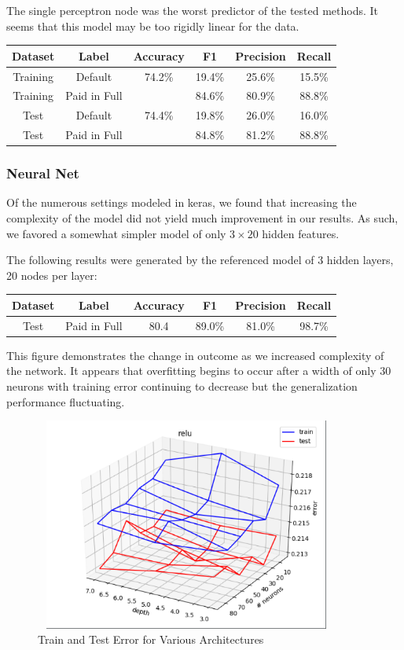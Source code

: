 The single perceptron node was the worst predictor of the tested methods. It seems that this model may be too rigidly linear for the data.

        \begin{center}
        \begin{tabular}{| c | c || c | c | c | c |}
        \hline
        Dataset & Label & Accuracy & F1 & Precision & Recall \\
        \hline \hline
         Training & Default         & 74.2\% & 19.4\% & 25.6\% & 15.5\% \\
         Training & Paid in Full    &       & 84.6\% & 80.9\% & 88.8\% \\
         \hline
         Test & Default             & 74.4\% & 19.8\% & 26.0\% & 16.0\% \\
         Test & Paid in Full        &       & 84.8\% & 81.2\% & 88.8\% \\
         \hline
        \end{tabular}
        \end{center}

\subsubsection{Neural Net}

Of the numerous settings modeled in keras, we found that increasing the complexity of the model did not yield much improvement in our results. As such, we favored a somewhat simpler model of only $3 \times 20$ hidden features.

The following results were generated by the referenced model of 3 hidden layers, 20 nodes per layer:

        \begin{center}
        \begin{tabular}{| c | c || c | c | c | c |}
        \hline
        Dataset & Label & Accuracy & F1 & Precision & Recall \\
        \hline \hline
         Test & Paid in Full        & 80.4 & 89.0\% & 81.0\% & 98.7\% \\
         \hline
        \end{tabular}
        \end{center}

This figure demonstrates the change in outcome as we increased complexity of the network. It appears that overfitting begins to occur after a width of only 30 neurons with training error continuing to decrease but the generalization performance fluctuating.

\begin{figure}[h!]
	\centering
	\includegraphics[width=10cm, height=7cm]{neural_nets.png}
	\caption{Train and Test Error for Various Architectures}
	\label{fig:neural_net}
\end{figure}
